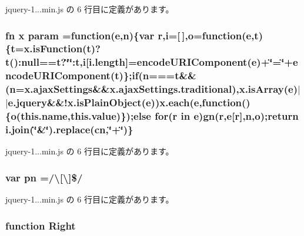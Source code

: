  jquery-\/1...\+min.\+js の 6 行目に定義があります。

\hypertarget{jquery-1_810_82_8min_8js_ae8915303d11557d1b001bc56b6195251}{}
\subsubsection[{param}]{ {\bf fn} {\bf x} param =function({\bf e},n)\{var r,i=\mbox{[}$\,$\mbox{]},{\bf o}=function({\bf e},{\bf t})\{{\bf t}=x.\+is\+Function({\bf t})?{\bf t}()\+:null=={\bf t}?\char`\"{}\char`\"{}\+:{\bf t},i\mbox{[}i.\+length\mbox{]}=encode\+U\+R\+I\+Component({\bf e})+\char`\"{}=\char`\"{}+encode\+U\+R\+I\+Component({\bf t})\};{\bf if}(n==={\bf t}\&\&(n=x.\+ajax\+Settings\&\&x.\+ajax\+Settings.\+traditional),x.\+is\+Array({\bf e})$\vert$$\vert$e.\+jquery\&\&!x.\+is\+Plain\+Object({\bf e})){\bf x.\+each}({\bf e},function()\{{\bf o}(this.\+name,this.\+value)\});else {\bf for}(r in {\bf e}){\bf gn}(r,{\bf e}\mbox{[}r\mbox{]},n,{\bf o});return i.\+join(\char`\"{}\&\char`\"{}).replace({\bf cn},\char`\"{}+\char`\"{})\}}\label{jquery-1_810_82_8min_8js_ae8915303d11557d1b001bc56b6195251}


 jquery-\/1...\+min.\+js の 6 行目に定義があります。

\hypertarget{jquery-1_810_82_8min_8js_a6a40831f7c967a457dbbd3b5e6f287d7}{}
\subsubsection[{pn}]{\setlength{\rightskip}{0pt plus 5cm}var pn =/\textbackslash{}\mbox{[}\textbackslash{}\mbox{]}\$/}\label{jquery-1_810_82_8min_8js_a6a40831f7c967a457dbbd3b5e6f287d7}


 jquery-\/1...\+min.\+js の 6 行目に定義があります。

\hypertarget{jquery-1_810_82_8min_8js_ac7f66efc33d974809d85fc5bdb00c6eb}{}
\subsubsection[{Right}]{\setlength{\rightskip}{0pt plus 5cm}function Right}\label{jquery-1_810_82_8min_8js_ac7f66efc33d974809d85fc5bdb00c6eb}



